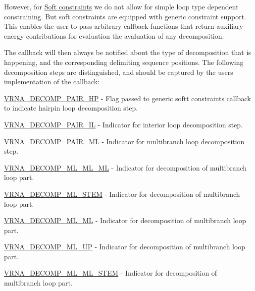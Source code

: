 However, for \hyperlink{group__soft__constraints}{Soft constraints} we do not allow for simple loop type dependent constraining. But soft constraints are equipped with generic constraint support. This enables the user to pass arbitrary callback functions that return auxiliary energy contributions for evaluation the avaluation of any decomposition.

The callback will then always be notified about the type of decomposition that is happening, and the corresponding delimiting sequence positions. The following decomposition steps are distinguished, and should be captured by the user\textquotesingle{}s implementation of the callback\+:


\begin{DoxyItemize}
\item \hyperlink{group__constraints_ga8bd41ebc8039378d242e4e8c273716a5}{V\+R\+N\+A\+\_\+\+D\+E\+C\+O\+M\+P\+\_\+\+P\+A\+I\+R\+\_\+\+HP} -\/ Flag passed to generic softt constraints callback to indicate hairpin loop decomposition step.
\item \hyperlink{group__constraints_gaeab04f34d7730cff2d651d782f95d857}{V\+R\+N\+A\+\_\+\+D\+E\+C\+O\+M\+P\+\_\+\+P\+A\+I\+R\+\_\+\+IL} -\/ Indicator for interior loop decomposition step.
\item \hyperlink{group__constraints_gaa15b1185673f0b9e900c4748d45f388f}{V\+R\+N\+A\+\_\+\+D\+E\+C\+O\+M\+P\+\_\+\+P\+A\+I\+R\+\_\+\+ML} -\/ Indicator for multibranch loop decomposition step.
\item \hyperlink{group__constraints_ga735517266f2e35e1374b8f1ea77ef23e}{V\+R\+N\+A\+\_\+\+D\+E\+C\+O\+M\+P\+\_\+\+M\+L\+\_\+\+M\+L\+\_\+\+ML} -\/ Indicator for decomposition of multibranch loop part.
\item \hyperlink{group__constraints_ga4a23054c75d8efc785de50e3ea87602f}{V\+R\+N\+A\+\_\+\+D\+E\+C\+O\+M\+P\+\_\+\+M\+L\+\_\+\+S\+T\+EM} -\/ Indicator for decomposition of multibranch loop part.
\item \hyperlink{group__constraints_ga7f4cb9ff7a33e67f0539bd39e7b19a78}{V\+R\+N\+A\+\_\+\+D\+E\+C\+O\+M\+P\+\_\+\+M\+L\+\_\+\+ML} -\/ Indicator for decomposition of multibranch loop part.
\item \hyperlink{group__constraints_gae6478dda14e50e2f2cb9ef333a29256e}{V\+R\+N\+A\+\_\+\+D\+E\+C\+O\+M\+P\+\_\+\+M\+L\+\_\+\+UP} -\/ Indicator for decomposition of multibranch loop part.
\item \hyperlink{group__constraints_ga63d8ceb8c96ae3b463e529e28cc0fe98}{V\+R\+N\+A\+\_\+\+D\+E\+C\+O\+M\+P\+\_\+\+M\+L\+\_\+\+M\+L\+\_\+\+S\+T\+EM} -\/ Indicator for decomposition of multibranch loop part.

\end{DoxyItemize}
